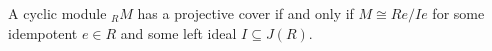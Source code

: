 A cyclic module ${}_R M$ has a projective cover if and only if $M \cong Re/Ie$ for some idempotent $e \in R$ and some left ideal $I \subseteq J(R)$.
